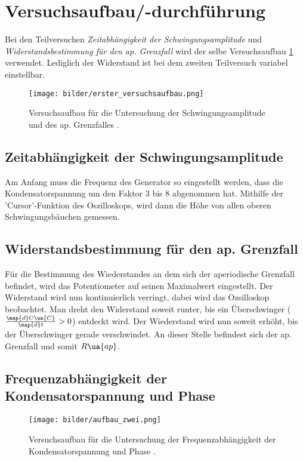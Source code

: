 \section{Versuchsaufbau/-durchführung}

Bei den Teilversuchen \emph{Zeitabhängigkeit der Schwingungsamplitude}
und \emph{Widerstandsbestimmung für den ap. Grenzfall} wird der selbe
Versuchsaufbau \ref{fig:aufbau_eins} verwendet. Lediglich der Widerstand ist bei dem
zweiten Teilversuch variabel einstellbar.
\begin{figure}
  \centering
  \texttt{[image: bilder/erster\_versuchsaufbau.png]}
  \caption{Versuchsaufbau für die Untersuchung der Schwingungsamplitude und des ap. Grenzfalles \cite{anleitung354}. }
  \label{fig:aufbau_eins}
\end{figure}


\subsection{Zeitabhängigkeit der Schwingungsamplitude}

Am Anfang muss die Frequenz des Generator %
so eingestellt werden, dass die Kondensatorspannung um den Faktor $3$ bis $8$
abgenommen hat. Mithilfe der 'Cursor'-Funktion des Oszilloskops, wird dann %
die Höhe von allen oberen Schwingungsbäuchen gemessen.

\subsection{Widerstandsbestimmung für den ap. Grenzfall}

Für die Bestimmung des Wiederstandes an dem sich %
der aperiodische Grenzfall befindet, wird das Potentiometer
auf seinen Maximalwert eingestellt.
Der Widerstand wird nun kontinuierlich verringt, dabei wird das %
Ozsilloskop beobachtet. Man dreht den Widerstand soweit runter, bis %
ein Überschwinger ($\frac{\map{d}U\ua{C}}{\map{d}t}>0$) entdeckt wird.
Der Wiederstand wird nun soweit erhöht, bis der Überschwinger gerade verschwindet.
An dieser Stelle befindest sich der ap. Grenzfall und somit $R\ua{ap}$. %

\subsection{Frequenzabhängigkeit der Kondensatorspannung und Phase}
\begin{figure}
  \centering
  \texttt{[image: bilder/aufbau\_zwei.png]}
  \caption{Versuchsaufbau für die Untersuchung der Frequenzabhängigkeit der Kondensatorspannung und Phase \cite{anleitung354}. }
  \label{fig:aufbau_zwei}
\end{figure}


